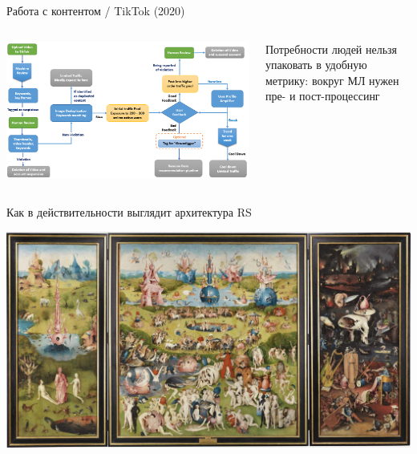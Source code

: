 \documentclass[11pt,aspectratio=169]{beamer}
\begin{document}
\begin{frame}{Работа с контентом / TikTok (2020) \cite{TIK}}
\begin{columns}
\begin{column}{0.6\textwidth}
   \begin{center}
		\includegraphics[scale=0.24]{images/tiktok.png}
   \end{center}
\end{column}
\begin{column}{0.3\textwidth}
    \begin{tcolorbox}[colback=info!5,colframe=info!80,title=]
    Потребности людей нельзя упаковать в удобную метрику: вокруг МЛ нужен пре- и пост-процессинг
    \end{tcolorbox}
\end{column}
\end{columns}

\end{frame}

\begin{frame}{Как в действительности выглядит архитектура RS}

\begin{center}
\includegraphics[scale=0.15]{images/bosch.jpeg}
\end{center}

\end{frame}
\end{document}
